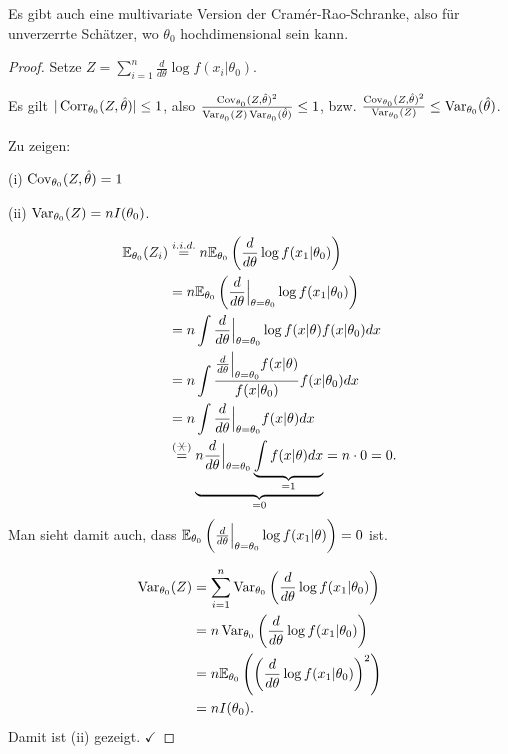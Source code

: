 \documentclass{tstextbook}
\begin{document}
\begin{remark}
	Es gibt auch eine multivariate Version der Cramér-Rao-Schranke, also für unverzerrte Schätzer, wo $\theta_0$ hochdimensional sein kann.
\end{remark}

\begin{proof}
	Setze $ Z=\sum_{i=1}^{n}\frac{d}{d\theta} \log f(x_i|\theta_0) $. 
	
	Es gilt $ |\operatorname{Corr}_{\theta_0}(Z,\hat{\theta})|\le 1 $, also $ \frac{\operatorname{Cov}_{\theta_0}(Z,\hat{\theta})^2}{\operatorname{Var}_{\theta_0}(Z)\operatorname{Var}_{\theta_0}(\hat{\theta})} \le 1 $, bzw. $ \frac{\operatorname{Cov}_{\theta_0}(Z,\hat{\theta})^2}{\operatorname{Var}_{\theta_0}(Z)} \le \operatorname{Var}_{\theta_0}(\hat{\theta}) $. 
	
	Zu zeigen:
	
	(i) $ \operatorname{Cov}_{\theta_0}(Z,\hat{\theta}) = 1 $
	
	(ii) $ \operatorname{Var}_{\theta_0}(Z) = nI(\theta_0) $.
	
	\[
	\begin{aligned}
		\E_{\theta_0}(Z_i) & \overset{i.i.d.}{=} n\E_{\theta_0}\left(\frac{d}{d\theta}\log f(x_1|\theta_0)\right) \\
		& = n\E_{\theta_0}\left(\frac{d}{d\theta}\Big|_{\theta=\theta_0}\log f(x_1|\theta_0)\right) \\
		& = n \int \frac{d}{d\theta}\Big|_{\theta=\theta_0} \log f(x|\theta)f(x|\theta_0) dx \\
		& = n \int \frac{\frac{d}{d\theta}\Big|_{\theta=\theta_0}f(x|\theta)}{f(x|\theta_0)} f(x|\theta_0) dx \\
		& = n \int \frac{d}{d\theta}\Big|_{\theta=\theta_0}f(x|\theta) dx \\
		& \overset{(\hexstar)}{=} \underbrace{n \frac{d}{d\theta}\Big|_{\theta=\theta_0} \underbrace{\int f(x|\theta) dx}_{=1}}_{=0} = n\cdot 0 = 0.
	\end{aligned}
	\]
	Man sieht damit auch, dass $ \mathbb E_{\theta_0}\left(\frac{d}{d\theta}\Big|_{\theta=\theta_0} \log f(x_1|\theta)\right) = 0 $ ist. 
	
	\[
	\begin{aligned}
		\operatorname{Var}_{\theta_0}(Z) & = \sum_{i=1}^{n}\operatorname{Var}_{\theta_0}\left(\frac{d}{d\theta}\log f(x_1|\theta_0)\right) \\
		& = n \operatorname{Var}_{\theta_0} \left(\frac{d}{d\theta}\log f(x_1|\theta_0)\right) \\
		& = n \mathbb E_{\theta_0} \left(\left(\frac{d}{d\theta}\log f(x_1|\theta_0)\right)^2\right) \\
		& = n I(\theta_0).
	\end{aligned}
	\]
	Damit ist (ii) gezeigt. $ \checkmark $
	

\end{proof}
\end{document}
